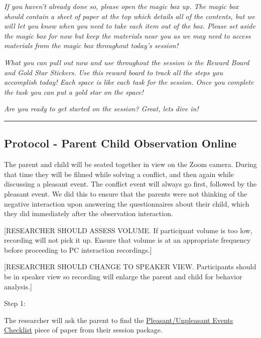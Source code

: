 \documentclass[]{book}
\begin{document}
\emph{If you haven't already done so, please open the magic box up. The magic box should contain a sheet of paper at the top which details all of the contents, but we will let you know when you need to take each item out of the box. Please set aside the magic box for now but keep the materials near you as we may need to access materials from the magic box throughout today's session!}

\emph{What you can pull out now and use throughout the session is the Reward Board and Gold Star Stickers. Use this reward board to track all the steps you accomplish today! Each space is like each task for the session. Once you complete the task you can put a gold star on the space!}

\emph{Are you ready to get started on the session? Great, lets dive in!}

\begin{center}\rule{0.5\linewidth}{0.5pt}\end{center}

\hypertarget{protocol---parent-child-observation-online-1}{%
\subsection{Protocol - Parent Child Observation Online}\label{protocol---parent-child-observation-online-1}}

The parent and child will be seated together in view on the Zoom camera. During that time they will be filmed while solving a conflict, and then again while discussing a pleasant event. The conflict event will always go first, followed by the pleasant event. We did this to ensure that the parents were not thinking of the negative interaction upon answering the questionnaires about their child, which they did immediately after the observation interaction.

{[}RESEARCHER SHOULD ASSESS VOLUME. If participant volume is too low, recording will not pick it up. Ensure that volume is at an appropriate frequency before proceeding to PC interaction recordings.{]}

{[}RESEARCHER SHOULD CHANGE TO SPEAKER VIEW. Participants should be in speaker view so recording will enlarge the parent and child for behavior analysis.{]}

Step 1:

The researcher will ask the parent to find the \href{https://ucla.app.box.com/file/630327764749}{Pleasant/Unpleasant Events Checklist} piece of paper from their session package.
\end{document}
